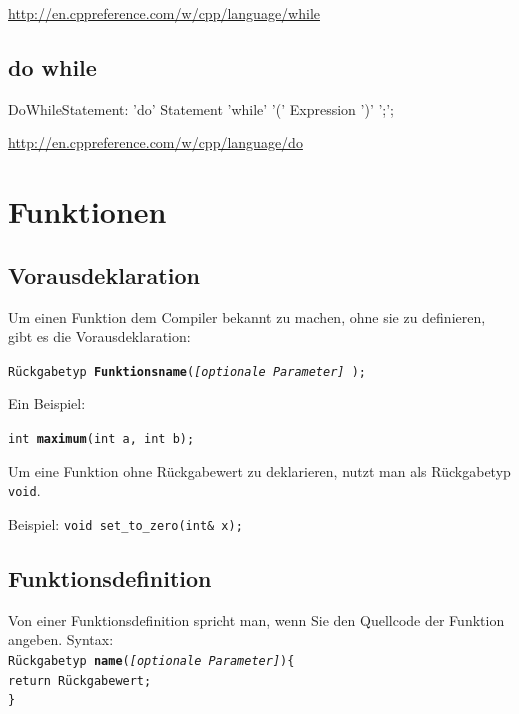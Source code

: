 \documentclass[a4paper]{report}
\begin{document}
\url{http://en.cppreference.com/w/cpp/language/while}
\subsection{do while}

\begin{rail}
	DoWhileStatement: 'do' Statement 'while' '(' Expression ')' ';';
\end{rail}
\url{http://en.cppreference.com/w/cpp/language/do}

\section{Funktionen}

\subsection{Vorausdeklaration}

Um einen Funktion dem Compiler bekannt zu machen, ohne sie zu definieren, gibt es die Vorausdeklaration:

\texttt{Rückgabetyp \textbf{Funktionsname}(\textit{[optionale Parameter]} );}

Ein Beispiel:

\texttt{int \textbf{maximum}(int a, int b);}

Um eine Funktion ohne Rückgabewert zu deklarieren, nutzt man als Rückgabetyp \texttt{void}.

Beispiel: \texttt{void set\_to\_zero(int\& x);}
 
\subsection{Funktionsdefinition}

Von einer Funktionsdefinition spricht man, wenn Sie den Quellcode der Funktion angeben. Syntax: \\
\texttt{Rückgabetyp \textbf{name}(\textit{[optionale Parameter]})\{ \\
\qquad return Rückgabewert; \\
\}}
\end{document}
